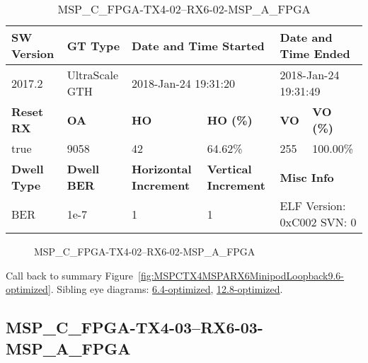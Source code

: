 \begin{table}[h]
\centering
\caption{MSP\_C\_FPGA-TX4-02--RX6-02-MSP\_A\_FPGA}
\label{tab:MSPCFPGATX402RX602MSPAFPGA9.6-optimized}
\begin{tabular}{@{}|l|l|l|l|l|l|@{}}
\toprule
\textbf{SW Version}                & \textbf{GT Type}   & \multicolumn{2}{l|}{\textbf{Date and Time Started}}            & \multicolumn{2}{l|}{\textbf{Date and Time Ended}}        \\ \midrule
2017.2                       & UltraScale GTH          & \multicolumn{2}{l|}{2018-Jan-24 19:31:20}                   & \multicolumn{2}{l|}{2018-Jan-24 19:31:49}               \\ \midrule
\textbf{Reset RX}                  & \textbf{OA} & \textbf{HO}   & \textbf{HO (\%)} & \textbf{VO} & \textbf{VO (\%)} \\ \midrule
true & 9058        & 42          & 64.62\%        & 255        & 100.00\%       \\ \midrule
\textbf{Dwell Type}                & \textbf{Dwell BER} & \textbf{Horizontal Increment} & \textbf{Vertical Increment}    & \multicolumn{2}{l|}{\textbf{Misc Info}}                  \\ \midrule
BER                            & 1e-7        & 1        & 1           & \multicolumn{2}{l|}{ELF Version: 0xC002 SVN: 0}                         \\ \bottomrule
\end{tabular}
\end{table}

\begin{figure}[h]
\caption{MSP\_C\_FPGA-TX4-02--RX6-02-MSP\_A\_FPGA} \label{fig:MSPCFPGATX402RX602MSPAFPGA9.6-optimized}
\end{figure}

Call back to summary Figure~\ref{fig:MSPCTX4MSPARX6MinipodLoopback9.6-optimized}.
Sibling eye diagrams: \hyperref[sec:MSPCFPGATX402RX602MSPAFPGA6.4-optimized]{6.4-optimized}, \hyperref[sec:MSPCFPGATX402RX602MSPAFPGA12.8-optimized]{12.8-optimized}.

\clearpage
\newpage


\subsection{MSP\_C\_FPGA-TX4-03--RX6-03-MSP\_A\_FPGA}\label{sec:MSPCFPGATX403RX603MSPAFPGA9.6-optimized}

